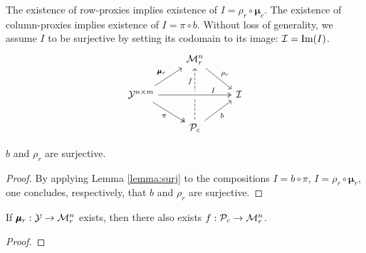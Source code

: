 \begin{appendices}
The existence of row-proxies implies existence of $I = \rho_r \circ \pmb{\mu}_c$.
The existence of column-proxies implies existence of $I = \pi \circ b$.
Without loss of generality, we assume $I$ to be surjective by setting its codomain to its image: $\mathcal{I} = \text{Im}(I)$.
%
\begin{equation}
  \begin{tikzcd}
    &
     \M_r^n
        \arrow[swap, dashleftarrow, "f" near start]{dd}{}
        \arrow{dr}{\rho_r}%
    &
    \\
    \Y^{n \times m}
        \arrow{ur}{\pmb{\mu}_r}
        \arrow[swap, two heads]{dr}{\pi}
        \arrow[crossing over, "I" near end, two heads]{rr}{}
    &
    &
    \I
    \\
    &
    \PP_c
        \arrow[swap]{ur}{b}
    &
  \end{tikzcd}
\end{equation}


\begin{lemma}
\label{lemma:surj functions}
$b$ and $\rho_r$ are surjective.
\end{lemma}
\begin{proof}
By applying Lemma \ref{lemma:surj} to the compositions
$I = b \circ \pi$,
$I =  \rho_r \circ \pmb{\mu}_r$,
one concludes, respectively, that $b$ and $\rho_r$ are surjective.
\end{proof}


\begin{lemma}
\label{lemma:f exists}
If $\pmb{\mu}_r: \mathcal{Y} \to \mathcal{M}^n_r$ exists, then there also exists $f: \mathcal{P}_c \to \mathcal{M}^n_r$.
\end{lemma}
\begin{proof}


\end{proof}
\end{appendices}
